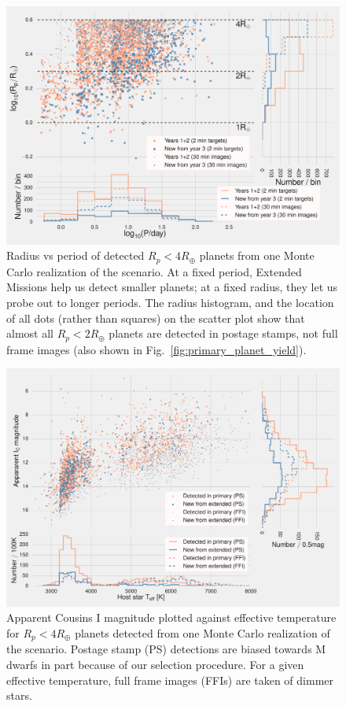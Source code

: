 \begin{figure}[t]
	\centering
	\includegraphics[]{figures/logR_vs_logP.pdf}
	\caption{Radius vs period of detected $R_p<4R_\oplus$ planets from one Monte Carlo realization of the \npole\:scenario.
	At a fixed period, Extended Missions help us detect smaller planets; at a fixed radius, they let us probe out to longer periods.
	The radius histogram, and the location of all dots (rather than squares) on the scatter plot show that almost all $R_p<2R_\oplus$ planets are detected in postage stamps, not full frame images (also shown in Fig.~\protect\ref{fig:primary_planet_yield}).}
	\label{fig:radius_vs_period_nhemi}
\end{figure}
\begin{figure}[t]
	\centering
	\includegraphics[]{figures/temp_imag_vs_teff_nhemi.pdf}
	\caption{Apparent Cousins I magnitude plotted against effective temperature for $R_p<4R_\oplus$ planets detected from one Monte Carlo realization of the \npole\:scenario. 
	Postage stamp (PS) detections are biased towards M dwarfs in part because of our selection procedure.
	For a given effective temperature, full frame images (FFIs) are taken of dimmer stars.}
	\label{fig:imag_vs_teff_nhemi}
\end{figure}

